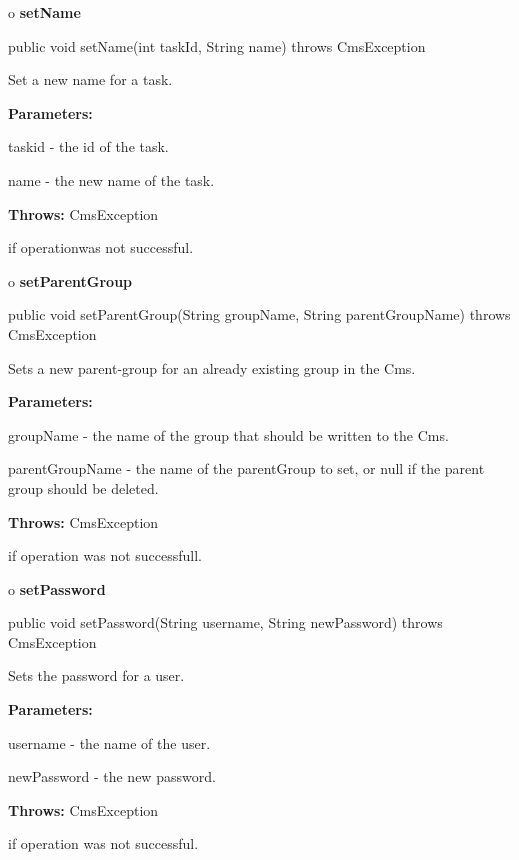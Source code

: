 o {\bf setName}

\begin{PRE}
 public void setName(int taskId,
                     String name) throws CmsException
\end{PRE}

\begin{description}
\htmlDD Set a new name for a task.

\begin{description}
\item {\bf Parameters:}

taskid - the id of the task.

name - the new name of the task.
\item {\bf Throws:} CmsException

if operationwas not successful.
\end{description}

\end{description}

o {\bf setParentGroup}

\begin{PRE}
 public void setParentGroup(String groupName,
                            String parentGroupName) throws CmsException
\end{PRE}

\begin{description}
\htmlDD Sets a new parent-group for an already existing group in the Cms.

\begin{description}
\item {\bf Parameters:}

groupName - the name of the group that should be written to the Cms.

parentGroupName - the name of the parentGroup to set, or null if the parent
group should be deleted.
\item {\bf Throws:} CmsException

if operation was not successfull.
\end{description}

\end{description}

o {\bf setPassword}

\begin{PRE}
 public void setPassword(String username,
                         String newPassword) throws CmsException
\end{PRE}

\begin{description}
\htmlDD Sets the password for a user.

\begin{description}
\item {\bf Parameters:}

username - the name of the user.

newPassword - the new password.
\item {\bf Throws:} CmsException

if operation was not successful.
\end{description}

\end{description}

